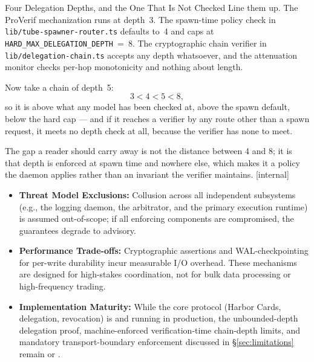\documentclass[11pt,a4paper]{article}
\theoremstyle{definition}
\begin{document}
\begin{pdexample}{Four Delegation Depths, and the One That Is Not Checked}
\setlength{\parskip}{4pt plus 1pt}
Line them up. The ProVerif mechanization runs at depth~3. The spawn-time
policy check in \texttt{lib/tube-spawner-router.ts} defaults to~4 and caps
at \texttt{HARD\_MAX\_DELEGATION\_DEPTH}~=~8. The cryptographic chain verifier
in \texttt{lib/delegation-chain.ts} accepts any depth whatsoever, and the
attenuation monitor checks per-hop monotonicity and nothing about length.

Now
take a chain of depth~5:
\[
3 < 4 < 5 < 8,
\]
so it is above what any model has
been checked at, above the spawn default, below the hard cap --- and if it
reaches a verifier by any route other than a spawn request, it meets no depth
check at all, because the verifier has none to meet.

The gap a reader should
carry away is not the distance between 4 and 8; it is that depth is enforced
at spawn time and nowhere else, which makes it a policy the daemon applies
rather than an invariant the verifier maintains. [internal]
\end{pdexample}

\begin{itemize}
    \item \textbf{Threat Model Exclusions:} Collusion across all independent subsystems (e.g., the logging daemon, the arbitrator, and the primary execution runtime) is assumed out-of-scope; if all enforcing components are compromised, the guarantees degrade to advisory.
    \item \textbf{Performance Trade-offs:} Cryptographic assertions and WAL-checkpointing for per-write durability incur measurable I/O overhead. These mechanisms are designed for high-stakes coordination, not for bulk data processing or high-frequency trading.
    \item \textbf{Implementation Maturity:} While the core protocol (Harbor Cards, delegation, revocation) is  and running in production, the unbounded-depth delegation proof, machine-enforced verification-time chain-depth limits, and mandatory transport-boundary enforcement discussed in \S\ref{sec:limitations} remain  or .
\end{itemize}
\end{document}
